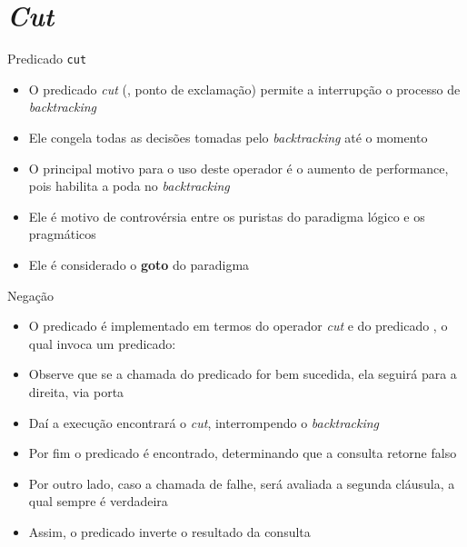 \section{\it Cut}

\begin{frame}[fragile]{Predicado {\tt cut}}

    \begin{itemize}
        \item O predicado \textit{cut} (, ponto de exclamação) permite 
            a interrupção o processo de \textit{backtracking}

        \item Ele congela todas as decisões tomadas pelo \textit{backtracking} até o momento

        \item O principal motivo para o uso deste operador é o aumento de performance, pois
            habilita a poda no \textit{backtracking}

        \item Ele é motivo de controvérsia entre os puristas do paradigma lógico e os 
            pragmáticos

        \item Ele é considerado o \textbf{goto} do paradigma


    \end{itemize}

\end{frame}

\begin{frame}[fragile]{Negação}

    \begin{itemize}
        \item O predicado  é implementado em termos do operador 
            \textit{cut} e do predicado , o qual invoca um predicado:


        \item Observe que se a chamada do predicado  for bem sucedida, ela
            seguirá para a direita, via porta 

        \item Daí a execução encontrará o \textit{cut}, interrompendo o \textit{backtracking}

        \item Por fim o predicado  é encontrado, determinando que a 
            consulta retorne falso

        \item Por outro lado, caso a chamada de  falhe, será avaliada a 
            segunda cláusula, a qual sempre é verdadeira

        \item Assim, o predicado  inverte o resultado da consulta
    \end{itemize}

\end{frame}
